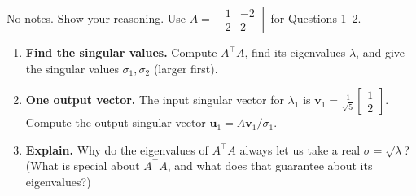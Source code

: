 \documentclass[10pt]{article}
\newcommand{\uu}{\mathbf{u}}
\newcommand{\vv}{\mathbf{v}}
\newcommand{\T}{^{\top}}
\begin{document}
\namedateperiod

\vspace{0.15in}

No notes. Show your reasoning. Use $A=\begin{bmatrix} 1 & -2 \\ 2 & 2 \end{bmatrix}$ for Questions 1--2.

\begin{enumerate}[leftmargin=1.8em, itemsep=16pt]
  \item \textbf{Find the singular values.} Compute $A\T A$, find its eigenvalues $\lambda$, and give the
        singular values $\sigma_1,\sigma_2$ (larger first).
        \vspace{1.7cm}
  \item \textbf{One output vector.} The input singular vector for $\lambda_1$ is
        $\vv_1=\frac{1}{\sqrt5}\begin{bmatrix} 1 \\ 2 \end{bmatrix}$. Compute the output singular vector
        $\uu_1=A\vv_1/\sigma_1$.
        \vspace{1.7cm}
  \item \textbf{Explain.} Why do the eigenvalues of $A\T A$ always let us take a real
        $\sigma=\sqrt{\lambda}$? (What is special about $A\T A$, and what does that guarantee about
        its eigenvalues?)
\end{enumerate}
\end{document}
